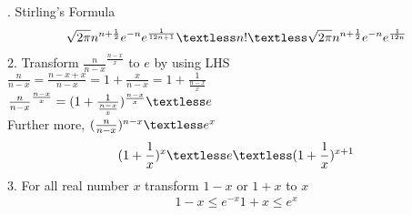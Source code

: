 . Stirling's Formula
\begin{align}
    \nonumber \sqrt{2\pi}n^{n+\frac{1}{2}}e^{-n}e^{\frac{1}{12n+1}}\textless n! \textless \sqrt{2\pi}n^{n+\frac{1}{2}}e^{-n}e^{\frac{1}{12n}} 
\end{align}
2. Transform $\frac{n}{n-x}^{\frac{n-x}{x}}$ to $e$ by using LHS\\
$\frac{n}{n-x}=\frac{n-x+x}{n-x}=1+\frac{x}{n-x}=1+\frac{1}{\frac{n-x}{x}}$\\
$\frac{n}{n-x}^{\frac{n-x}{x}}=(1+\frac{1}{\frac{n-x}{x}})^{\frac{n-x}{x}} \textless e$\\
Further more, $(\frac{n}{n-x})^{n-x} \textless e^{x}$
\begin{align}
    \nonumber (1+\frac{1}{x})^{x} \textless e \textless (1+\frac{1}{x})^{x+1}
\end{align}
3. For all real number $x$ transform $1-x$ or $1+x$ to $x$
\begin{align}
    \nonumber 1-x \le e^{-x}
    \nonumber 1+x \le e^{x}
\end{align}